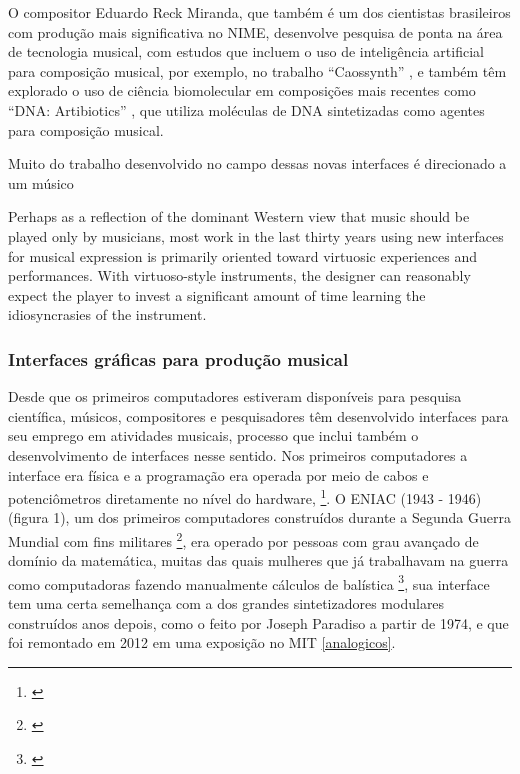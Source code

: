 
O compositor Eduardo Reck Miranda, que também é um dos cientistas brasileiros com produção mais significativa no NIME, desenvolve pesquisa de ponta na área de tecnologia musical, com estudos que incluem o uso de inteligência artificial para composição musical, por exemplo, no trabalho ``Caossynth'' \citeyear{Miranda2016}, e também têm explorado o uso de ciência biomolecular em composições mais recentes como ``DNA: Artibiotics'' \citeyear{miranda2018artibiotics}, que utiliza moléculas de DNA sintetizadas como agentes para composição musical.


Muito do trabalho desenvolvido no campo dessas novas interfaces é direcionado a um músico  

\begin{citacao}
Perhaps as a reflection of the dominant Western view that music should be played only by musicians, most work in the last thirty years using new interfaces for musical expression is primarily oriented toward virtuosic experiences and performances. With virtuoso-style instruments, the designer can reasonably expect the player to invest a significant amount of time learning the idiosyncrasies of the instrument. \cite{Blaine2003}
\end{citacao}



\subsubsection{Interfaces gráficas para produção musical}

Desde que os primeiros computadores estiveram disponíveis para pesquisa científica, músicos, compositores e pesquisadores têm desenvolvido interfaces para seu emprego em atividades musicais, processo que inclui também o desenvolvimento de interfaces nesse sentido. Nos primeiros computadores a interface era física e a programação era operada por meio de cabos e potenciômetros diretamente no nível do hardware, \footnote{\cite[110]{Henrique1996}}. O ENIAC (1943 - 1946) (figura 1), um dos primeiros computadores construídos durante a Segunda Guerra Mundial com fins militares \footnote{\cite[24]{Stolfi}}, era operado por pessoas com grau avançado de domínio da matemática, muitas das quais mulheres que já trabalhavam na guerra como computadoras fazendo manualmente cálculos de balística \footnote{\cite{HayleyWilliams2015}}, sua interface tem uma certa semelhança com a dos grandes sintetizadores modulares construídos anos depois, como o feito por Joseph Paradiso a partir de 1974, e que foi remontado em 2012 em uma exposição no MIT \ref{analogicos}. 

